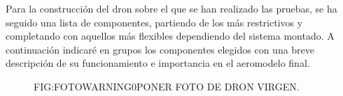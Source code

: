 
 Para la construcción del dron sobre el que se han realizado las pruebas, se ha seguido una lista de componentes, partiendo de los más restrictivos y completando con aquellos más flexibles dependiendo del sistema montado.
 A continuación indicaré en grupos los componentes elegidos con una breve descripción de su funcionamiento e importancia en el aeromodelo final.
 
  \begin{figure}[Dron básico]{FIG:FOTOWARNING0}{PONER FOTO DE DRON VIRGEN.}
\end{figure}